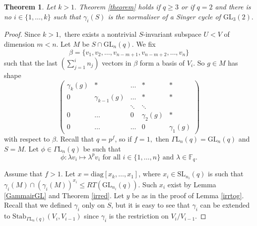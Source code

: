 \documentclass[a4paper,reqno,11pt]{amsart}
\newtheorem{Th}{Theorem}[section]
\theoremstyle{definition}
\theoremstyle{remark}
\numberwithin{equation}{section}
\newcommand{\diag}{\mathrm{diag}}
\newcommand{\Stab}{\mathrm{Stab}}
\newcommand{\GaL}{{\Gamma \mathrm{L}}}
\newcommand{\SL}{{\mathrm{SL}}}
\newcommand{\GL}{{\mathrm{GL}}}
\begin{document}
\begin{Th}
\label{lem41}
Let $k>1.$ Theorem {\rm \ref{theorem}} holds if
 $q \ge 3$ or
if  $q=2$ and there is no  $i \in \{1, \ldots, k\}$ such that $\gamma_i(S)$ is the normaliser of a Singer cycle of $\GL_3(2).$

\end{Th} 
\begin{proof}

Since $k>1,$ there exists a nontrivial $S$-invariant subspace $U<V$ of dimension $m<n$. Let $M$ be $S \cap \GL_n(q).$ We fix  
\begin{equation}
\label{basGLG}
\beta=\{v_1, v_2, \ldots, v_{n-m+1}, v_{n-m+2}, \ldots, v_n \} 
\end{equation}
such that the last $ \left( \sum_{j=1}^i n_j \right)$  
 vectors in $\beta$ form a basis of $V_i$. So  $g \in M$ has  shape 
\begin{equation}
\label{stupG}
\begin{pmatrix}
\gamma_k(g)     & * & \ldots & * & * \\
0          &    \gamma_{k-1}(g)  & \ldots & * & * \\
     &     & \ddots & \ddots  &    \\
   0    &    \ldots& 0 & \gamma_{2}(g) & * \\
      0    &   \ldots        & \ldots& 0 & \gamma_{1}(g) 
\end{pmatrix}
\end{equation}
 with respect to $\beta.$ Recall that $q=p^f$, so if $f=1,$ then $\GaL_n(q)=\GL_n(q)$ and $S=M.$ Let  $\phi \in \GaL_n(q)$ be such that \begin{equation}
\label{phidef}
\phi : \lambda v_i \mapsto \lambda^p v_i \text{ for all } i \in \{1, \ldots, n\} \text{ and } \lambda \in \mathbb{F}_q.
\end{equation}

Assume that $f>1.$  Let $x= \diag[x_k, \ldots, x_1]$, where $x_i\in \SL_{n_i}(q)$ is such that $\gamma_i(M) \cap (\gamma_i(M))^{x_i} \le RT(\GL_{n_i}(q))$. Such $x_i$ exist by Lemma \ref{GammairGL} and Theorem \ref{irred}. Let $y$ be as in the proof of Lemma \ref{irrtog}. Recall that  we defined $\gamma_i$ only on $S$, but it is easy to see that $\gamma_i$ can be extended to $\Stab_{\GaL_n(q)}(V_i, V_{i-1})$ since $\gamma_i$ is the restriction on $V_i/V_{i-1}.$


\end{proof}
\end{document}
